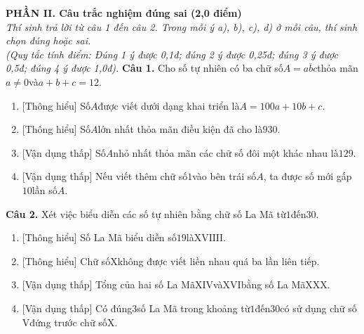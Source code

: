 \documentclass[11pt,a4paper]{article}
\begin{document}
\vspace{6pt}
\noindent
\textbf{\large PHẦN II. Câu trắc nghiệm đúng sai (2,0 điểm)}\\
\textit{\small Thí sinh trả lời từ câu 1 đến câu 2. Trong mỗi ý a), b), c), d) ở mỗi câu, thí sinh chọn đúng hoặc sai.}\\
\textit{\small (Quy tắc tính điểm: Đúng 1 ý được 0,1đ; đúng 2 ý được 0,25đ; đúng 3 ý được 0,5đ; đúng 4 ý được 1,0đ).}
\vspace{6pt}
\noindent\textbf{Câu 1.} Cho số tự nhiên có ba chữ số$A = \overline{abc}$thỏa mãn$a \ne 0$và$a + b + c = 12$.\par\vspace{2pt}
\begin{enumerate}[label=\textbf{\alph*)}, leftmargin=1.2cm, itemsep=2pt, topsep=2pt]
  \item \textnormal{[Thông hiểu]} Số$A$được viết dưới dạng khai triển là$A = 100a + 10b + c$.
  \item \textnormal{[Thông hiểu]} Số$A$lớn nhất thỏa mãn điều kiện đã cho là$930$.
  \item \textnormal{[Vận dụng thấp]} Số$A$nhỏ nhất thỏa mãn các chữ số đôi một khác nhau là$129$.
  \item \textnormal{[Vận dụng thấp]} Nếu viết thêm chữ số$1$vào bên trái số$A$, ta được số mới gấp$10$lần số$A$.
\end{enumerate}
\vspace{6pt}

\noindent\textbf{Câu 2.} Xét việc biểu diễn các số tự nhiên bằng chữ số La Mã từ$1$đến$30$.\par\vspace{2pt}
\begin{enumerate}[label=\textbf{\alph*)}, leftmargin=1.2cm, itemsep=2pt, topsep=2pt]
  \item \textnormal{[Thông hiểu]} Số La Mã biểu diễn số$19$là$\mathrm{XVIIII}$.
  \item \textnormal{[Thông hiểu]} Chữ số$\mathrm{X}$không được viết liền nhau quá ba lần liên tiếp.
  \item \textnormal{[Vận dụng thấp]} Tổng của hai số La Mã$\mathrm{XIV}$và$\mathrm{XVI}$bằng số La Mã$\mathrm{XXX}$.
  \item \textnormal{[Vận dụng thấp]} Có đúng$3$số La Mã trong khoảng từ$1$đến$30$có sử dụng chữ số$\mathrm{V}$đứng trước chữ số$\mathrm{X}$.
\end{enumerate}
\vspace{6pt}
\end{document}
